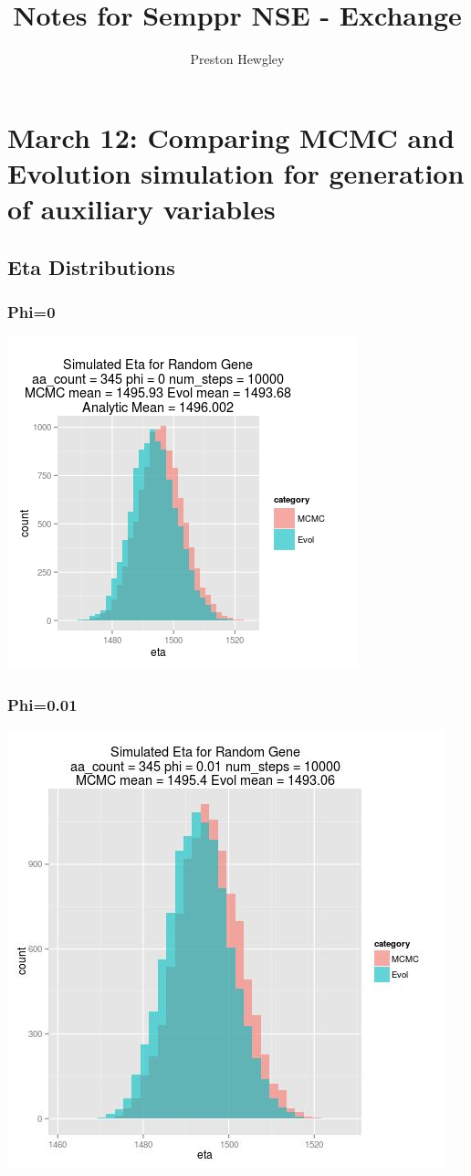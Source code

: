 \documentclass{article}
\title{\textbf{Notes for Semppr NSE - Exchange}}
\author{Preston Hewgley}
\begin{document}
\maketitle

\section{March 12: Comparing MCMC and Evolution simulation for generation of auxiliary variables}

\subsection{Eta Distributions}

\subsubsection{Phi=0}
\includegraphics[scale=.65]{../eta_distbns/0_phi.jpg}
\subsubsection{Phi=0.01}
\includegraphics[scale=.5]{../eta_distbns/001_phi.jpg}
\end{document}

